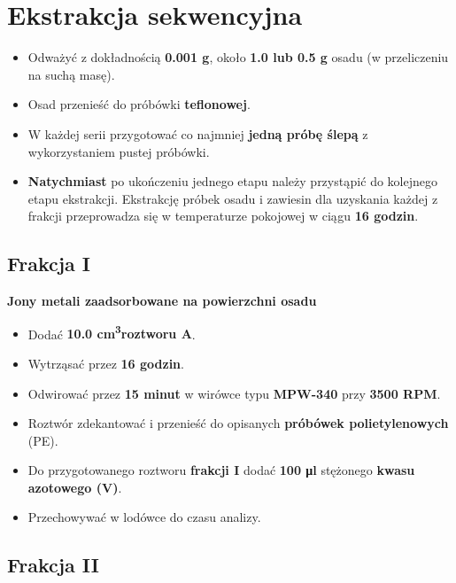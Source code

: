 \documentclass[
  letterpaper,
  DIV=11,
  numbers=noendperiod]{scrreprt}
\begin{document}
\hypertarget{ekstrakcja-sekwencyjna-1}{%
\section{Ekstrakcja sekwencyjna}\label{ekstrakcja-sekwencyjna-1}}

\begin{itemize}
\item
  Odważyć z dokładnością \textbf{0.001 g}, około \textbf{1.0 lub 0.5 g}
  osadu (w przeliczeniu na suchą masę).
\item
  Osad przenieść do próbówki \textbf{teflonowej}.
\item
  W każdej serii przygotować co najmniej \textbf{jedną próbę ślepą} z
  wykorzystaniem pustej próbówki.
\item
  \textbf{Natychmiast} po ukończeniu jednego etapu należy przystąpić do
  kolejnego etapu ekstrakcji. Ekstrakcję próbek osadu i zawiesin dla
  uzyskania każdej z frakcji przeprowadza się w temperaturze pokojowej w
  ciągu \textbf{16 godzin}.
\end{itemize}

\hypertarget{frakcja-i}{%
\subsection{Frakcja I}\label{frakcja-i}}

\textbf{Jony metali zaadsorbowane na powierzchni osadu}

\begin{itemize}
\item
  Dodać \textbf{10.0 cm\textsuperscript{3}roztworu A}.
\item
  Wytrząsać przez \textbf{16 godzin}.
\item
  Odwirować przez \textbf{15 minut} w wirówce typu \textbf{MPW-340} przy
  \textbf{3500 RPM}.
\item
  Roztwór zdekantować i przenieść do opisanych \textbf{próbówek
  polietylenowych} (PE).
\item
  Do przygotowanego roztworu \textbf{frakcji I} dodać \textbf{100 μl}
  stężonego \textbf{kwasu azotowego (V)}.
\item
  Przechowywać w lodówce do czasu analizy.
\end{itemize}

\hypertarget{frakcja-ii}{%
\subsection{Frakcja II}\label{frakcja-ii}}
\end{document}

